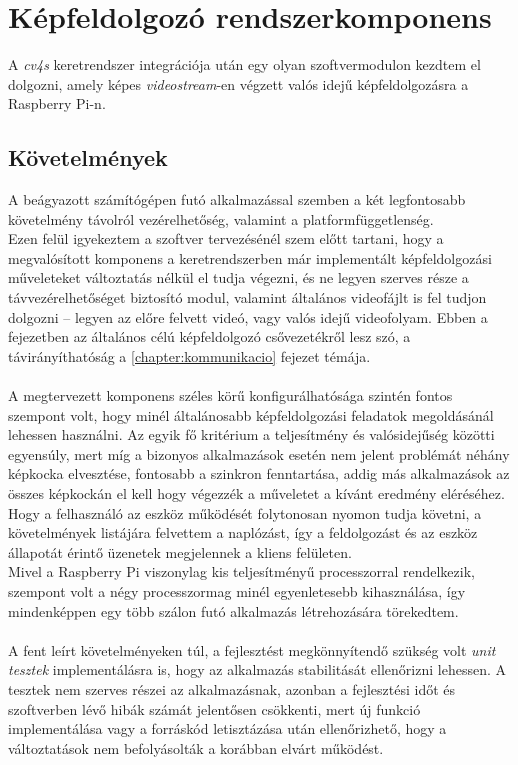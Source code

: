 \chapter{Képfeldolgozó rendszerkomponens}

A \emph{cv4s} keretrendszer integrációja után egy olyan szoftvermodulon kezdtem el dolgozni, amely képes \textit{videostream}-en végzett valós idejű képfeldolgozásra a Raspberry Pi-n. 

\section{Követelmények}

A beágyazott számítógépen futó alkalmazással szemben a két legfontosabb követelmény távolról vezérelhetőség, valamint a platformfüggetlenség. \\
Ezen felül igyekeztem a szoftver tervezésénél szem előtt tartani, hogy a megvalósított komponens a keretrendszerben már implementált képfeldolgozási műveleteket változtatás nélkül el tudja végezni, és ne legyen szerves része a távvezérelhetőséget biztosító modul, valamint általános videofájlt is fel tudjon dolgozni -- legyen az előre felvett videó, vagy valós idejű videofolyam. Ebben a fejezetben az általános célú képfeldolgozó csővezetékről lesz szó, a távirányíthatóság a \ref{chapter:kommunikacio} fejezet témája. \\
\\
A megtervezett komponens széles körű konfigurálhatósága szintén fontos szempont volt, hogy minél általánosabb képfeldolgozási feladatok megoldásánál lehessen használni. Az egyik fő kritérium a teljesítmény és valósidejűség közötti egyensúly, mert míg a  bizonyos alkalmazások esetén nem jelent problémát néhány képkocka elvesztése, fontosabb a szinkron fenntartása, addig más alkalmazások az összes képkockán el kell hogy végezzék a műveletet a kívánt eredmény eléréséhez.\\
Hogy a felhasználó az eszköz működését folytonosan nyomon tudja követni, a követelmények listájára felvettem a naplózást, így a feldolgozást és az eszköz állapotát érintő üzenetek megjelennek a kliens felületen.\\
Mivel a Raspberry Pi viszonylag kis teljesítményű processzorral rendelkezik, szempont volt a négy processzormag minél egyenletesebb kihasználása, így mindenképpen egy több szálon futó alkalmazás létrehozására törekedtem.\\
\\
A fent leírt követelményeken túl, a fejlesztést megkönnyítendő szükség volt \emph{unit tesztek} implementálásra is, hogy az alkalmazás stabilitását ellenőrizni lehessen. A tesztek nem szerves részei az alkalmazásnak, azonban a fejlesztési időt és szoftverben lévő hibák számát jelentősen csökkenti, mert új funkció implementálása vagy a forráskód letisztázása után ellenőrizhető, hogy a változtatások nem befolyásolták a korábban elvárt működést.

